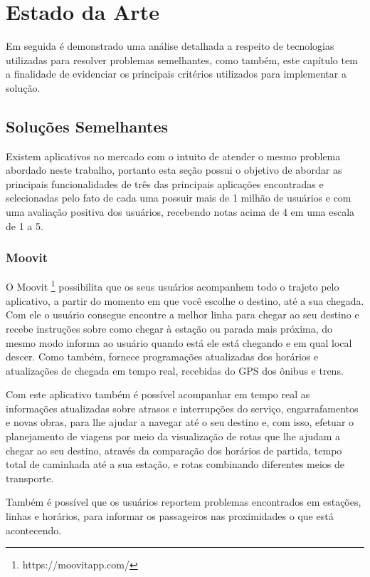 \chapter{Estado da Arte}

Em seguida é demonstrado uma análise detalhada a respeito de tecnologias utilizadas para resolver problemas semelhantes, como também, este capítulo tem a finalidade de evidenciar os principais critérios utilizados para implementar a solução.

\section{Soluções Semelhantes}

Existem aplicativos no mercado com o intuito de atender o mesmo problema abordado neste trabalho, portanto esta seção possui o objetivo de abordar as principais funcionalidades de três das principais aplicações encontradas e selecionadas pelo fato de cada uma possuir mais de 1 milhão de usuários e com uma avaliação positiva dos usuários, recebendo notas acima de 4 em uma escala de 1 a 5.

\subsection{Moovit}

O Moovit \footnote{https://moovitapp.com/} possibilita que os seus usuários acompanhem todo o trajeto pelo aplicativo, a partir do momento em que você escolhe o destino, até a sua chegada. Com ele o usuário consegue encontre a melhor linha para chegar ao seu destino e recebe instruções sobre como chegar à estação ou parada mais próxima, do mesmo modo informa ao usuário quando está ele está chegando e em qual local descer. Como também, fornece programações atualizadas dos horários e atualizações de chegada em tempo real, recebidas do GPS dos ônibus e trens.

Com este aplicativo também é possível acompanhar em tempo real as informações atualizadas sobre atrasos e interrupções do serviço, engarrafamentos e novas obras, para lhe ajudar a navegar até o seu destino e, com isso, efetuar o planejamento de viagens por meio da visualização de rotas que lhe ajudam a chegar ao seu destino, através da comparação dos horários de partida, tempo total de caminhada até a sua estação, e rotas combinando diferentes meios de transporte.

Também é possível que os usuários reportem problemas encontrados em estações, linhas e horários, para informar os passageiros nas proximidades o que está acontecendo.


